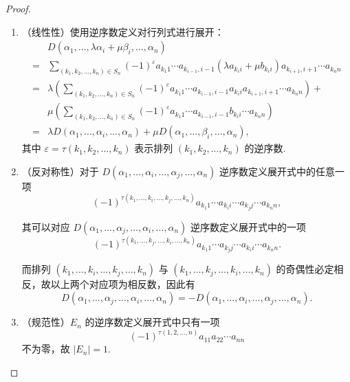 \begin{proof}
    \begin{enumerate}
        \item （线性性）使用逆序数定义对行列式进行展开：
            \begin{align*}
                & D(\alpha_1, \ldots , \lambda\alpha_i + \mu\beta_i, \ldots, \alpha_n) \\
                ={} & \sum_{(k_1, k_2, \ldots, k_n) \in S_n} (-1)^{\varepsilon} a_{k_1 1} \cdots a_{k_{i-1},i-1} (\lambda a_{k_i i} + \mu b_{k_i i}) a_{k_{i+1},i+1} \cdots a_{k_n n} \\
                ={} & \lambda \left(\sum_{(k_1, k_2, \ldots, k_n) \in S_n} (-1)^{\varepsilon} a_{k_1 1} \cdots a_{k_{i-1},i-1} a_{k_i i} a_{k_{i+1},i+1} \cdots a_{k_n n} \right) + \\
                    {} & \mu \left(\sum_{(k_1, k_2, \ldots, k_n) \in S_n} (-1)^{\varepsilon} a_{k_1 1} \cdots a_{k_{i-1},i-1} b_{k_i i} \cdots a_{k_n n}\right) \\
                ={} & \lambda D(\alpha_1, \ldots, \alpha_i, \ldots, \alpha_n) + \mu D(\alpha_1, \ldots, \beta_i, \ldots, \alpha_n),
            \end{align*}
            其中 $\varepsilon = \tau(k_1, k_2, \ldots, k_n)$ 表示排列 $(k_1, k_2, \ldots, k_n)$ 的逆序数.

        \item （反对称性）对于 $D(\alpha_1, \ldots, \alpha_i, \ldots, \alpha_j, \ldots, \alpha_n)$ 逆序数定义展开式中的任意一项
            \[
                (-1)^{\tau(k_1, \ldots, k_i, \ldots, k_j, \ldots, k_n)} a_{k_1 1} \cdots a_{k_i i} \cdots a_{k_j j} \cdots a_{k_n n},
            \]

            其可以对应 $D(\alpha_1, \ldots, \alpha_j, \ldots, \alpha_i, \ldots, \alpha_n)$ 逆序数定义展开式中的一项
            \[
                (-1)^{\tau(k_1, \ldots, k_j, \ldots, k_i, \ldots, k_n)} a_{k_1 1} \cdots a_{k_j j} \cdots a_{k_i i} \cdots a_{k_n n}.
            \]

            而排列 $(k_1, \ldots, k_i, \ldots, k_j, \ldots, k_n)$ 与 $(k_1, \ldots, k_j, \ldots, k_i, \ldots, k_n)$ 的奇偶性必定相反，故以上两个对应项为相反数，因此有
            \[
                D(\alpha_1, \ldots, \alpha_j, \ldots, \alpha_i, \ldots, \alpha_n) = -D(\alpha_1, \ldots, \alpha_i, \ldots, \alpha_j, \ldots, \alpha_n).
            \]

        \item （规范性）$E_n$ 的逆序数定义展开式中只有一项
            \[
                (-1)^{\tau(1, 2, \ldots, n)} a_{11} a_{22} \cdots a_{nn}
            \]
            不为零，故 $|E_n| = 1$.
    \end{enumerate}
\end{proof}

